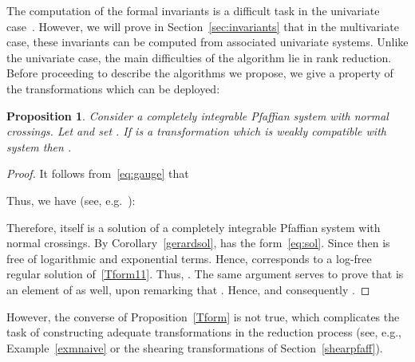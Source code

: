 \documentclass[final,1p,times,number,amsthm]{elsart}
\newtheorem{proposition}[lemma]{Proposition}
\begin{document}
The computation of the formal invariants is a difficult task in the univariate
case~\cite{key24,B10}. However, we will prove in Section~\ref{sec:invariants} that
in the multivariate case, these invariants can be computed from associated
univariate systems. Unlike the univariate case, the main difficulties of the
algorithm lie in rank reduction. Before proceeding to describe the algorithms we
propose, we give a property of the transformations which can be deployed:
\begin{proposition}
\label{Tform}
Consider a completely integrable Pfaffian system  with normal
crossings. Let  and set . If  is a
transformation which is weakly compatible with system  then
.
\end{proposition}
\begin{proof}
It follows from~\eqref{eq:gauge} that

Thus, we have (see, e.g.~\cite[Proposition 1, proof, pp 6]{key6}):

Therefore,  itself is a solution of a completely integrable Pfaffian
system with normal crossings. By Corollary~\ref{gerardsol},  has the
form~\eqref{eq:sol}. Since  then  is free
of logarithmic and exponential terms. Hence,  corresponds to a log-free
regular solution of~\eqref{Tform11}. Thus, . The same
argument serves to prove that  is an element of  as
well, upon remarking that . Hence,
 and consequently .
\end{proof}
However, the converse of Proposition~\eqref{Tform} is not true, which
complicates the task of constructing adequate transformations in the reduction
process (see, e.g., Example~\ref{exmnaive} or the shearing transformations of
Section~\ref{shearpfaff}).
\end{document}
